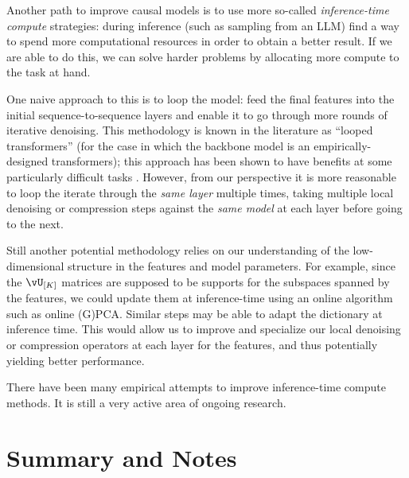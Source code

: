 \documentclass[../../book-main.tex]{subfiles}
\begin{document}
\begin{example}
    Another path to improve causal models is to use more so-called
    \textit{inference-time compute} strategies: during inference
    (such as sampling from an LLM) find a way to spend more
    computational resources in order to obtain a better result. If we are
    able to do this, we can solve harder problems by allocating more
    compute to the task at hand.

    One naive approach to this is to loop the model: feed the final
    features into the initial sequence-to-sequence layers and enable
    it to go through more rounds of iterative denoising. This
    methodology is known in the literature as ``looped transformers''
    (for the case in which the backbone model is an
    empirically-designed transformers); this approach has been shown
    to have benefits at some particularly difficult tasks
    \citep{giannou2023looped,yang2023looped,saunshi2025reasoning}.
    However, from our perspective it is more reasonable to loop the
    iterate through the \textit{same layer} multiple times, taking
    multiple local denoising or compression steps against the
    \textit{same model} at each layer before going to the next.

    Still another potential methodology relies on our understanding
    of the low-dimensional structure in the features and model
    parameters. For example, since the \(\vU_{[K]}\) matrices are
    supposed to be supports for the subspaces spanned by the
    features, we could update them at inference-time using an online
    algorithm such as online (G)PCA. Similar steps may be able to
    adapt the dictionary at inference time. This would allow us to
    improve and specialize our local denoising or compression
    operators at each layer for the features, and thus potentially
    yielding better performance.

    There have been many empirical attempts to improve inference-time
    compute methods. It is still a very active area of ongoing research.
\end{example}


\section{Summary and Notes}
\end{document}
